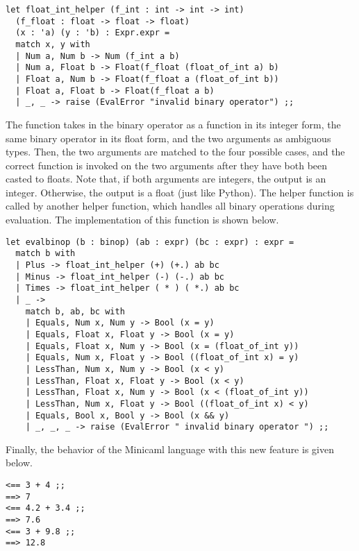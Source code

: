 \documentclass{article}
\begin{document}
\begin{verbatim}
let float_int_helper (f_int : int -> int -> int) 
  (f_float : float -> float -> float) 
  (x : 'a) (y : 'b) : Expr.expr =
  match x, y with
  | Num a, Num b -> Num (f_int a b)
  | Num a, Float b -> Float(f_float (float_of_int a) b)
  | Float a, Num b -> Float(f_float a (float_of_int b))
  | Float a, Float b -> Float(f_float a b)
  | _, _ -> raise (EvalError "invalid binary operator") ;;
\end{verbatim}

The function takes in the binary operator as a function in its integer form, the same binary operator in its float form, and the two arguments as ambiguous types. Then, the two arguments are matched to the four possible cases, and the correct function is invoked on the two arguments after they have both been casted to floats. Note that, if both arguments are integers, the output is an integer. Otherwise, the output is a float (just like Python). The helper function is called by another helper function, which handles all binary operations during evaluation. The implementation of this function is shown below. 

\begin{verbatim}
let evalbinop (b : binop) (ab : expr) (bc : expr) : expr =
  match b with
  | Plus -> float_int_helper (+) (+.) ab bc
  | Minus -> float_int_helper (-) (-.) ab bc
  | Times -> float_int_helper ( * ) ( *.) ab bc
  | _ -> 
    match b, ab, bc with
    | Equals, Num x, Num y -> Bool (x = y)
    | Equals, Float x, Float y -> Bool (x = y)
    | Equals, Float x, Num y -> Bool (x = (float_of_int y))
    | Equals, Num x, Float y -> Bool ((float_of_int x) = y)
    | LessThan, Num x, Num y -> Bool (x < y)
    | LessThan, Float x, Float y -> Bool (x < y)
    | LessThan, Float x, Num y -> Bool (x < (float_of_int y))
    | LessThan, Num x, Float y -> Bool ((float_of_int x) < y)
    | Equals, Bool x, Bool y -> Bool (x && y)
    | _, _, _ -> raise (EvalError " invalid binary operator ") ;;
\end{verbatim}

Finally, the behavior of the Minicaml language with this new feature is given below.

\begin{verbatim}
<== 3 + 4 ;;
==> 7
<== 4.2 + 3.4 ;;
==> 7.6
<== 3 + 9.8 ;;
==> 12.8
\end{verbatim}
\end{document}
